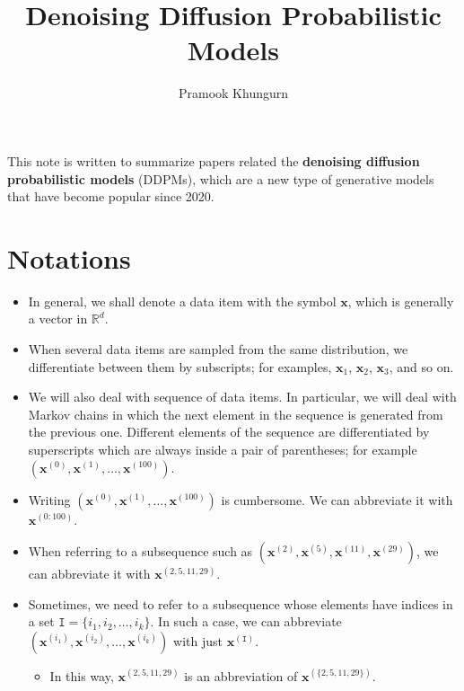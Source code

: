 \documentclass[10pt]{article}
\title{Denoising Diffusion Probabilistic Models}
\author{Pramook Khungurn}
\newcommand{\ve}[1]{\mathbf{#1}}
\newcommand{\Real}{\mathbb{R}}
\begin{document}
\maketitle

This note is written to summarize papers related the {\bf denoising diffusion probabilistic models} (DDPMs), which are a new type of generative models that have become popular since 2020.

\section{Notations}

\begin{itemize}
  \item In general, we shall denote a data item with the symbol $\ve{x}$, which is generally a vector in $\Real^d$.
  
  \item When several data items are sampled from the same distribution, we differentiate between them by subscripts; for examples, $\ve{x}_1$, $\ve{x}_2$, $\ve{x}_3$, and so on.
  
  \item We will also deal with sequence of data items. In particular, we will deal with Markov chains in which the next element in the sequence is generated from the previous one. Different elements of the sequence are differentiated by superscripts which are always inside a pair of parentheses; for example $(\ve{x}^{(0)}, \ve{x}^{(1)}, \dotsc, \ve{x}^{(100)})$.
  
  \item Writing $(\ve{x}^{(0)}, \ve{x}^{(1)}, \dotsc, \ve{x}^{(100)})$ is cumbersome. We can abbreviate it with $\ve{x}^{(0:100)}$.
  
  \item When referring to a subsequence such as $(\ve{x}^{(2)}, \ve{x}^{(5)}, \ve{x}^{(11)}, \ve{x}^{(29)})$, we can abbreviate it with $\ve{x}^{(2, 5, 11, 29)}$.
  
  \item Sometimes, we need to refer to a subsequence whose elements have indices in a set $\mathtt{I} = \{ i_1, i_2, \dotsc, i_k \}$. In such a case, we can abbreviate $(\ve{x}^{(i_1)}, \ve{x}^{(i_2)}, \dotsc, \ve{x}^{(i_k)})$ with just $\ve{x}^{(\mathtt{I})}$.
  \begin{itemize}
    \item In this way, $\ve{x}^{(2, 5, 11, 29)}$ is an abbreviation of $\ve{x}^{(\{2, 5, 11, 29\})}$.
  \end{itemize}
  

\end{itemize}
\end{document}
